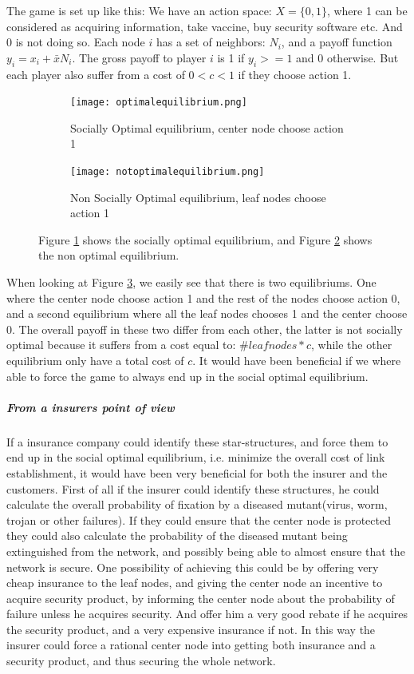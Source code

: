 The game is set up like this:
We have an action space: $X=\{0,1\}$, where 1 can be considered as acquiring information, take vaccine, buy security software etc. And 0 is not doing so.
Each node $i$ has a set of neighbors: $N_{i} $, and a payoff function $y_{i}=x_{i}+\bar{x}N_{i}$. 
The gross payoff to player $i$ is 1 if $y_{i}>=1$ and 0 otherwise. But each player also suffer from a cost of $0<c<1$ if they choose action 1.
\begin{figure}[h]
\centering
\begin{subfigure}{.4\textwidth}
  \centering
  \texttt{[image: optimalequilibrium.png]}
  \caption{\label{fig:optequi} Socially Optimal equilibrium, center node choose action 1}
\end{subfigure}
\quad
\begin{subfigure}{.4\textwidth}
  \centering
  \texttt{[image: notoptimalequilibrium.png]}
  \caption{\label{fig:notoptequi} Non Socially Optimal equilibrium, leaf nodes choose action 1}
\end{subfigure}
\caption{\label{fig:starequi} Figure \ref{fig:optequi} shows the socially optimal equilibrium, and Figure \ref{fig:notoptequi} shows the non optimal equilibrium.}

\end{figure}
When looking at Figure \ref{fig:starequi}, we easily see that there is two equilibriums. One where the center node choose action 1 and the rest of the nodes choose action 0, and a second equilibrium where all the leaf nodes chooses 1 and the center choose 0.
The overall payoff in these two differ from each other, the latter is not socially optimal because it
 suffers from a cost equal to: $\#leaf nodes*c$, while the other equilibrium only have a total cost of $c$.
 It would have been beneficial if we where able to force the game to always end up in the social optimal equilibrium.


\subparagraph{From a insurers point of view}
If a insurance company could identify these star-structures, and force them to end up in the social optimal equilibrium, i.e. minimize the overall cost of link establishment, it would have been very beneficial for both the insurer and the customers.
First of all if the insurer could identify these structures, he could calculate the overall probability of fixation by a diseased mutant(virus, worm, trojan or other failures). If they could ensure that the center node is protected they could also calculate the probability of the diseased mutant being extinguished from the network, and possibly being able to almost ensure that the network is secure. 
One possibility of achieving this could be by offering very cheap insurance to the leaf nodes, and giving the center node an incentive to acquire security product, by informing the center node about the probability of failure unless he acquires security. And offer him a very good rebate if he acquires the security product, and a very expensive insurance if not. In this way the insurer could force a rational center node into getting both insurance and a security product, and thus securing the whole network.

